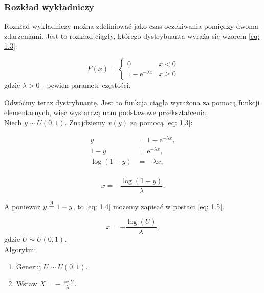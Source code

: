 \documentclass{article}
\theoremstyle{break}
\newcommand*{\e}{\mathrm{e}}
\numberwithin{equation}{subsection}
\numberwithin{figure}{section}
\begin{document}
\newpage

\subsubsection{Rozkład wykładniczy}

Rozkład wykładniczy można zdefiniować jako czas oczekiwania pomiędzy dwoma zdarzeniami. Jest to rozkład ciągły, którego dystrybuanta wyraża się wzorem \eqref{eq: 1.3}:

\begin{equation}
F(x) = \begin{cases}
  0  & x < 0 \\
  1 - \e^{-\lambda x} & x\ge 0 \label{eq: 1.3}
\end{cases}
\end{equation}
gdzie $\lambda > 0$ - pewien parametr częstości.

Odwóćmy teraz dystrybuantę. Jest to funkcja ciągła wyrażona za pomocą funkcji elementarnych, więc wystarczą nam podstawowe przekształcenia.\\
Niech $y \sim U(0, 1)$. Znajdziemy $x(y)$ za pomocą \eqref{eq: 1.3}:

\begin{equation}
\begin{aligned}
	y &= 1 - \e^{-\lambda x},\\
	1-y &= \e^{-\lambda x},\\
	\log(1-y) &= -\lambda x,\\
\end{aligned}
\end{equation}

\begin{equation}
x = -\frac{\log(1-y)}{\lambda}. \label{eq: 1.4}
\end{equation}

A ponieważ $y \buildrel d \over = 1-y$, to \eqref{eq: 1.4} możemy zapisać w postaci \eqref{eq: 1.5}.

\begin{equation}
x = -\frac{\log(U)}{\lambda} \label{eq: 1.5},
\end{equation}
gdzie $U \sim U(0, 1)$.\\

Algorytm:
\begin{enumerate}
\item Generuj $U \sim U(0, 1)$.
\item Wstaw $ X = -\frac{\log{U}}{\lambda}$.
\end{enumerate}
\end{document}
